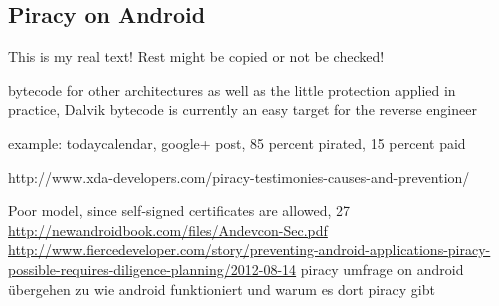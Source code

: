 \subsection{Piracy on Android }\label{subsection:foundation-piracy-android}
This is my real text! Rest might be copied or not be checked!

%
bytecode for other architectures as well as the little protection
applied in practice, Dalvik bytecode is currently an easy target for the reverse engineer
%

%

example: todaycalendar, google+ post, 85 percent pirated, 15 percent paid\cite{developersPiracy}


\cite{xdaPiracy}
%

http://www.xda-developers.com/piracy-testimonies-causes-and-prevention/

Poor model, since self-signed certificates are allowed, 27 \url{http://newandroidbook.com/files/Andevcon-Sec.pdf}\newline
\url{http://www.fiercedeveloper.com/story/preventing-android-applications-piracy-possible-requires-diligence-planning/2012-08-14} piracy umfrage on android\newline
übergehen zu wie android funktioniert und warum es dort piracy gibt\newline
